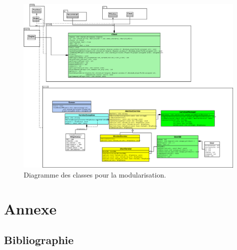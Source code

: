 \documentclass[a4paper,12pt]{article}
\begin{document}
    \begin{landscape}
    \begin{figure}[p]
    \includegraphics[width=0.7\paperheight]{module.png}
    \caption{\label{uml:module}Diagramme des classes pour la modularisation.}
    \end{figure}
    \end{landscape}
    
    \clearpage
    \section{Annexe}
    \label{sec:Annexe}
    \subsection{Bibliographie}

    
\end{document}
